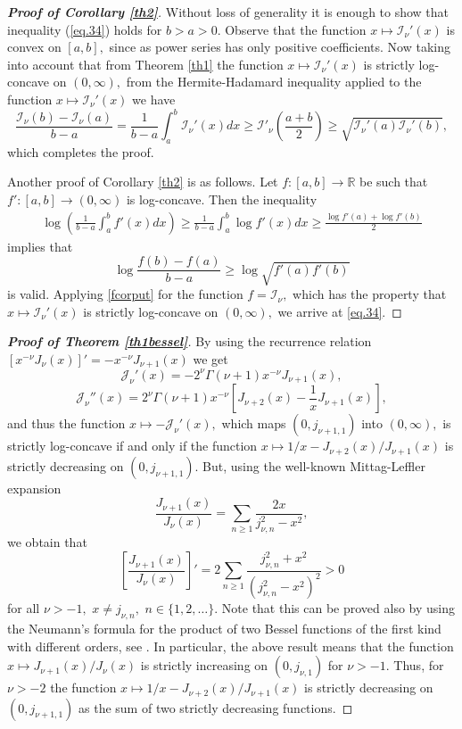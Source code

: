 \documentclass[10pt]{amsart}
\begin{document}
\begin{proof}[\bf Proof of Corollary \ref{th2}]
Without loss of generality it is enough to show that
inequality (\ref{eq.34}) holds for $b>a>0.$ Observe that the
function $x\mapsto\mathcal{I}_{\nu}'(x)$ is convex on $[a,b],$ since
as power series has only positive coefficients. Now taking into
account that from Theorem \ref{th1} the function $x\mapsto\mathcal{I}_{\nu}'(x)$ is strictly log-concave on $(0,\infty),$
from the Hermite-Hadamard inequality \cite[p.
14]{mi} applied to the function $x\mapsto\mathcal{I}_{\nu}'(x)$ we
have
$$\frac{\mathcal{I}_{\nu}(b)-\mathcal{I}_{\nu}(a)}{b-a}=\frac{1}{b-a}\int_a^b\mathcal{I}_{\nu}'(x)dx\geq
\mathcal{I}'_{\nu}\left(\frac{a+b}{2}\right)\geq
\sqrt{\mathcal{I}_{\nu}'(a)\mathcal{I}_{\nu}'(b)},$$ which completes the proof.

Another proof of Corollary \ref{th2} is as follows. Let $f:[a,b]\to\mathbb{R}$ be such that $f':[a,b]\to(0,\infty)$ is log-concave. Then the inequality \cite[p. 242]{corput}
\begin{align}\label{fcorput}
\log\left(\frac{1}{b-a}\int_a^bf'(x)dx\right)\geq \frac{1}{b-a}\int_a^b\log f'(x)dx\geq\frac{\log f'(a)+\log f'(b)}{2}
\end{align}
implies that
$$\log \frac{f(b)-f(a)}{b-a}\geq \log\sqrt{f'(a)f'(b)}$$
is valid. Applying \eqref{fcorput} for the function $f=\mathcal{I}_{\nu},$ which has the property that $x\mapsto\mathcal{I}_{\nu}'(x)$ is strictly log-concave on $(0,\infty),$
we arrive at \eqref{eq.34}.
\end{proof}

\begin{proof}[\bf Proof of Theorem \ref{th1bessel}] By using the recurrence relation \cite[p. 45]{watson} $\left[x^{-\nu}J_{\nu}(x)\right]'=-x^{-\nu}J_{\nu+1}(x)$ we get
$$\mathcal{J}_{\nu}'(x)=-2^{\nu}\Gamma(\nu+1)x^{-\nu}J_{\nu+1}(x),$$
$$\mathcal{J}_{\nu}''(x)=2^{\nu}\Gamma(\nu+1)x^{-\nu}\left[J_{\nu+2}(x)-\frac{1}{x}J_{\nu+1}(x)\right],$$
and thus the function $x\mapsto -\mathcal{J}_{\nu}'(x),$ which maps $(0,j_{\nu+1,1})$ into $(0,\infty),$ is strictly log-concave if and only if the function $x\mapsto {1}/{x}-J_{\nu+2}(x)/J_{\nu+1}(x)$ is strictly decreasing on $(0,j_{\nu+1,1}).$ But, using the well-known Mittag-Leffler expansion
$$\frac{J_{\nu+1}(x)}{J_{\nu}(x)}=\sum_{n\geq 1}\frac{2x}{j_{\nu,n}^2-x^2},$$
we obtain that
$$\left[\frac{J_{\nu+1}(x)}{J_{\nu}(x)}\right]'=2\sum_{n\geq 1}\frac{j_{\nu,n}^2+x^2}{(j_{\nu,n}^2-x^2)^2}>0$$
for all $\nu>-1,$ $x\neq j_{\nu,n},$ $n\in\{1,2,\dots\}.$ Note that this can be proved also by using the Neumann's formula for the product of two Bessel functions of the first kind with different orders, see \cite[Lemma 2.5]{im}. In particular, the above result means that the function $x\mapsto J_{\nu+1}(x)/J_{\nu}(x)$ is strictly increasing on $(0,j_{\nu,1})$ for $\nu>-1.$ Thus, for $\nu>-2$ the function $x\mapsto {1}/{x}-J_{\nu+2}(x)/J_{\nu+1}(x)$ is strictly decreasing on $(0,j_{\nu+1,1})$ as the sum of two strictly decreasing functions.
\end{proof}
\end{document}
